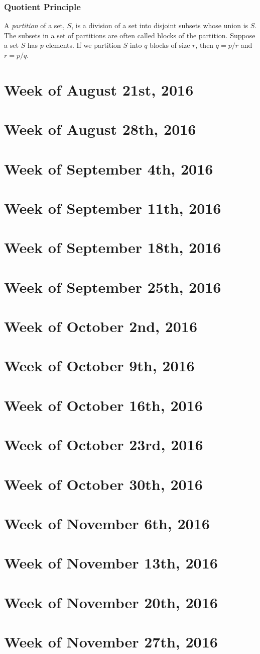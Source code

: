\documentclass{article}
\begin{document}
\subsubsection{Quotient Principle}
A \textit{partition} of a set, $S$, is a division of a set into disjoint subsets whose union is $S$. The subsets in a set of partitions are often called blocks of the partition. \newline
\noindent Suppose a set $S$ has $p$ elements. If we partition $S$ into $q$ blocks of size $r$, then $q=p/r$ and $r=p/q$.

\section{Week of August 21st, 2016}
\section{Week of August 28th, 2016}
\section{Week of September 4th, 2016}
\section{Week of September 11th, 2016}
\section{Week of September 18th, 2016}
\section{Week of September 25th, 2016}
\section{Week of October 2nd, 2016}
\section{Week of October 9th, 2016}
\section{Week of October 16th, 2016}
\section{Week of October 23rd, 2016}
\section{Week of October 30th, 2016}
\section{Week of November 6th, 2016}
\section{Week of November 13th, 2016}
\section{Week of November 20th, 2016}
\section{Week of November 27th, 2016}
\end{document}
